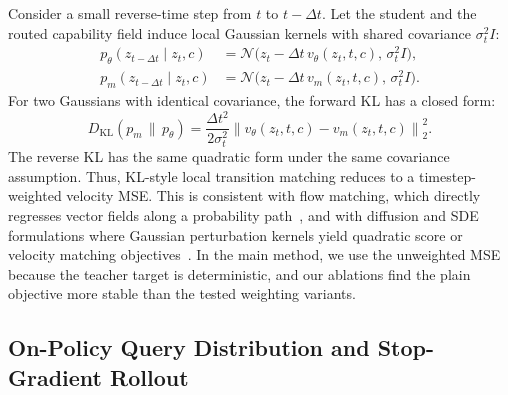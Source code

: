Consider a small reverse-time step from $t$ to $t-\Delta t$. Let the student and the routed capability field induce local Gaussian kernels with shared covariance $\sigma_t^2 I$:
\begin{align}
  p_\theta(z_{t-\Delta t}\mid z_t,c)
  &= \mathcal{N}\bigl(z_t - \Delta t\,v_\theta(z_t,t,c),\,\sigma_t^2 I\bigr),\\
  p_m(z_{t-\Delta t}\mid z_t,c)
  &= \mathcal{N}\bigl(z_t - \Delta t\,v_m(z_t,t,c),\,\sigma_t^2 I\bigr).
\end{align}
For two Gaussians with identical covariance, the forward KL has a closed form:
\begin{equation}
  D_{\mathrm{KL}}(p_m\,\|\,p_\theta)
  =
  \frac{\Delta t^2}{2\sigma_t^2}
  \left\|v_\theta(z_t,t,c)-v_m(z_t,t,c)\right\|_2^2.
  \label{eq:app-kl-mse}
\end{equation}
The reverse KL has the same quadratic form under the same covariance assumption. Thus, KL-style local transition matching reduces to a timestep-weighted velocity MSE. This is consistent with flow matching, which directly regresses vector fields along a probability path~\cite{lipman2022flow}, and with diffusion and SDE formulations where Gaussian perturbation kernels yield quadratic score or velocity matching objectives~\cite{sohl2015deep,song2019generative,ho2020denoising,nichol2021improved,song2020denoising,dhariwal2021diffusion,song2020score}. In the main method, we use the unweighted MSE because the teacher target is deterministic, and our ablations find the plain objective more stable than the tested weighting variants.


\vspace{0.2cm}


\subsection{On-Policy Query Distribution and Stop-Gradient Rollout}
\label{app:onpolicy-sg}


